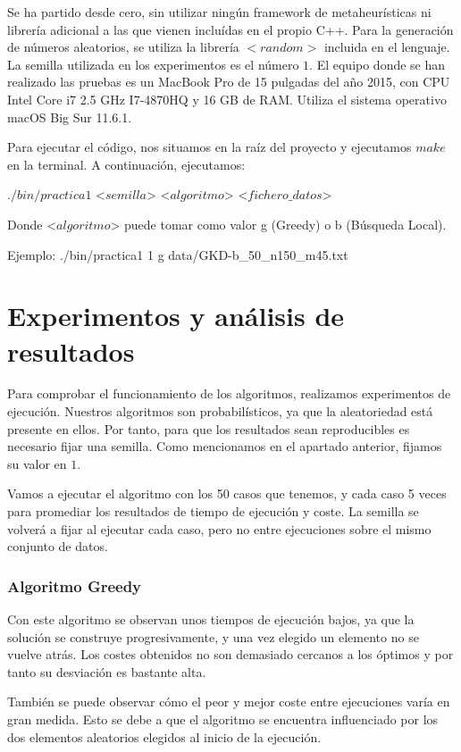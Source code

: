 Se ha partido desde cero, sin utilizar ningún framework de metaheurísticas ni librería adicional a las que vienen incluídas en el propio C++. Para la generación de números aleatorios, se utiliza la librería $<random>$ incluida en el lenguaje. La semilla utilizada en los experimentos es el número $1$. El equipo donde se han realizado las pruebas es un MacBook Pro de 15 pulgadas del año 2015, con CPU Intel Core i7 2.5 GHz I7-4870HQ y 16 GB de RAM. Utiliza el sistema operativo macOS Big Sur 11.6.1.

Para ejecutar el código, nos situamos en la raíz del proyecto y ejecutamos $make$ en la terminal. A continuación, ejecutamos:

\noindent $./bin/practica1$ <$semilla$> \space <$algoritmo$> \space <$fichero\_datos$>

\noindent Donde <$algoritmo$> \space puede tomar como valor g (Greedy) o b (Búsqueda Local).

\noindent Ejemplo: ./bin/practica1 1 g data/GKD-b\_50\_n150\_m45.txt


\part{Experimentos y análisis de resultados}
Para comprobar el funcionamiento de los algoritmos, realizamos experimentos de ejecución. Nuestros algoritmos son probabilísticos, ya que la aleatoriedad está presente en ellos. Por tanto, para que los resultados sean reproducibles es necesario fijar una semilla. Como mencionamos en el apartado anterior, fijamos su valor en $1$. 

Vamos a ejecutar el algoritmo con los 50 casos que tenemos, y cada caso 5 veces para promediar los resultados de tiempo de ejecución y coste. La semilla se volverá a fijar al ejecutar cada caso, pero no entre ejecuciones sobre el mismo conjunto de datos.

\section{Algoritmo Greedy}
Con este algoritmo se observan unos tiempos de ejecución bajos, ya que la solución se construye progresivamente, y una vez elegido un elemento no se vuelve atrás. Los costes obtenidos no son demasiado cercanos a los óptimos y por tanto su desviación es bastante alta. 

También se puede observar cómo el peor y mejor coste entre ejecuciones varía en gran medida. Esto se debe a que el algoritmo se encuentra influenciado por los dos elementos aleatorios elegidos al inicio de la ejecución.

